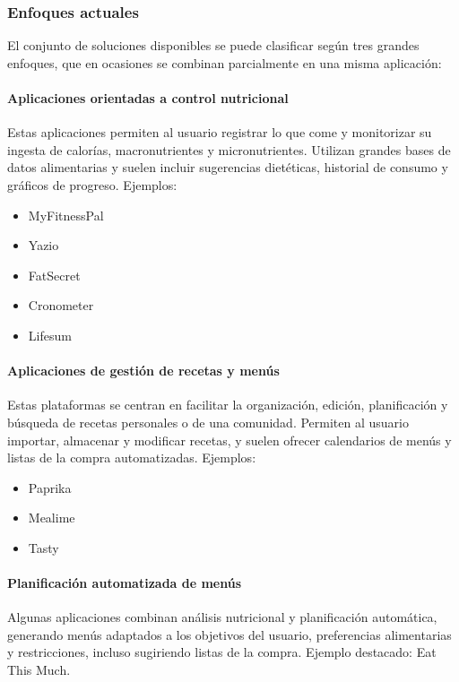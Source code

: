 \subsubsection*{Enfoques actuales}

El conjunto de soluciones disponibles se puede clasificar según tres grandes enfoques, que en ocasiones se combinan parcialmente en una misma aplicación:


\paragraph*{Aplicaciones orientadas a control nutricional}
Estas aplicaciones permiten al usuario registrar lo que come y monitorizar su ingesta de calorías, macronutrientes y micronutrientes. Utilizan grandes bases de datos alimentarias y suelen incluir sugerencias dietéticas, historial de consumo y gráficos de progreso. Ejemplos:

\begin{itemize}
  \item MyFitnessPal
  \item Yazio
  \item FatSecret
  \item Cronometer
  \item Lifesum
\end{itemize}

\paragraph*{Aplicaciones de gestión de recetas y menús}
Estas plataformas se centran en facilitar la organización, edición, planificación y búsqueda de recetas personales o de una comunidad. Permiten al usuario importar, almacenar y modificar recetas, y suelen ofrecer calendarios de menús y listas de la compra automatizadas. Ejemplos:

\begin{itemize}
  \item Paprika
  \item Mealime
  \item Tasty
\end{itemize}

\paragraph*{Planificación automatizada de menús}
Algunas aplicaciones combinan análisis nutricional y planificación automática, generando menús adaptados a los objetivos del usuario, preferencias alimentarias y restricciones, incluso sugiriendo listas de la compra. Ejemplo destacado: Eat This Much.

